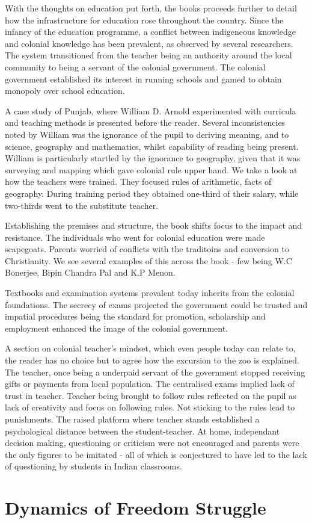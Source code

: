 \documentclass[a4paper]{article}
\begin{document}
    With the thoughts on education put forth, the books
    proceeds further to detail how the infrastructure
    for education rose throughout the country. Since the
    infancy of the education programme, a conflict
    between indigeneous knowledge and colonial knowledge
    has been prevalent, as observed by several
    researchers. The system transitioned from the
    teacher being an authority around the local
    community to being a servant of the colonial
    government. The colonial government established its
    interest in running schools and gamed to obtain
    monopoly over school education.


    A case study of Punjab, where William D. Arnold
    experimented with curricula and teaching methods is
    presented before the reader. Several inconsistencies
    noted by William was the ignorance of the pupil to
    deriving meaning, and to science, geography and
    mathematics, whilst capability of reading being
    present. William is particularly startled by the
    ignorance to geography, given that it was surveying
    and mapping which gave colonial rule upper hand. We
    take a look at how the teachers were trained. They
    focused rules of arithmetic, facts of geography.
    During training period they obtained one-third of
    their salary, while two-thirds went to the
    substitute teacher.


    Establishing the premises and structure, the book
    shifts focus to the impact and resistance. The
    individuals who went for colonial education were
    made scapegoats. Parents worried of conflicts with
    the traditoins and conversion to Christianity. We
    see several examples of this across the book - few
    being W.C Bonerjee, Bipin Chandra Pal and K.P Menon.


    Textbooks and examination systems prevalent today
    inherits from the colonial foundations. The secrecy
    of exams projected the government could be trusted
    and impatial procedures being the standard for
    promotion, scholarship and employment enhanced the
    image of the colonial government.


    A section on colonial teacher's mindset, which even
    people today can relate to, the reader has no choice
    but to agree how the excursion to the zoo is
    explained. The teacher, once being a underpaid
    servant of the government stopped receiving gifts or
    payments from local population. The centralised
    exams implied lack of trust in teacher. Teacher
    being brought to follow rules reflected on the pupil
    as lack of creativity and focus on following rules.  
    Not sticking to the rules lead to punishments. The
    raised platform where teacher stands established a
    psychological distance between the student-teacher.
    At home, independant decision making, questioning or
    criticism were not encouraged and parents were the
    only figures to be imitated - all of which is
    conjectured to have led to the lack of questioning
    by students in Indian classrooms.

\section{Dynamics of Freedom Struggle}


\printbibliography 
\end{document}
